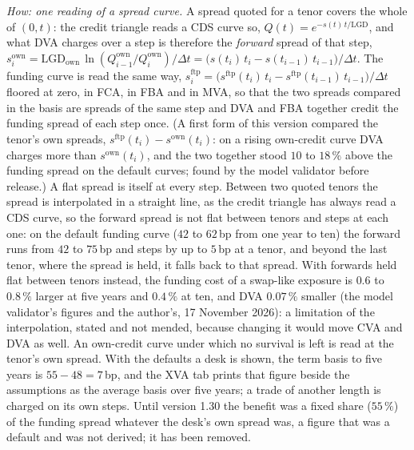 \documentclass[11pt,a4paper]{article}
\begin{document}
\emph{How: one reading of a spread curve.} A spread quoted for a tenor covers the whole of $(0,t)$: the credit triangle reads a CDS curve so, $Q(t)=e^{-s(t)\,t/\mathrm{LGD}}$, and what DVA charges over a step is therefore the \emph{forward} spread of that step, $s^{\mathrm{own}}_i=\mathrm{LGD}_{\mathrm{own}}\,\ln(Q^{\mathrm{own}}_{i-1}/Q^{\mathrm{own}}_i)/\Delta t=\big(s(t_i)\,t_i-s(t_{i-1})\,t_{i-1}\big)/\Delta t$. The funding curve is read the same way, $s^{\mathrm{ftp}}_i=\big(s^{\mathrm{ftp}}(t_i)\,t_i-s^{\mathrm{ftp}}(t_{i-1})\,t_{i-1}\big)/\Delta t$ floored at zero, in FCA, in FBA and in MVA, so that the two spreads compared in the basis are spreads of the same step and DVA and FBA together credit the funding spread of each step once. (A first form of this version compared the tenor's own spreads, $s^{\mathrm{ftp}}(t_i)-s^{\mathrm{own}}(t_i)$: on a rising own-credit curve DVA charges more than $s^{\mathrm{own}}(t_i)$, and the two together stood $10$ to $18\,\%$ above the funding spread on the default curves; found by the model validator before release.) A flat spread is itself at every step. Between two quoted tenors the spread is interpolated in a straight line, as the credit triangle has always read a CDS curve, so the forward spread is not flat between tenors and steps at each one: on the default funding curve ($42$ to $62$\,bp from one year to ten) the forward runs from $42$ to $75$\,bp and steps by up to $5$\,bp at a tenor, and beyond the last tenor, where the spread is held, it falls back to that spread. With forwards held flat between tenors instead, the funding cost of a swap-like exposure is $0.6$ to $0.8\,\%$ larger at five years and $0.4\,\%$ at ten, and DVA $0.07\,\%$ smaller (the model validator's figures and the author's, 17 November 2026): a limitation of the interpolation, stated and not mended, because changing it would move CVA and DVA as well. An own-credit curve under which no survival is left is read at the tenor's own spread. With the defaults a desk is shown, the term basis to five years is $55-48=7$\,bp, and the XVA tab prints that figure beside the assumptions as the average basis over five years; a trade of another length is charged on its own steps. Until version 1.30 the benefit was a fixed share ($55\,\%$) of the funding spread whatever the desk's own spread was, a figure that was a default and was not derived; it has been removed.
\end{document}
